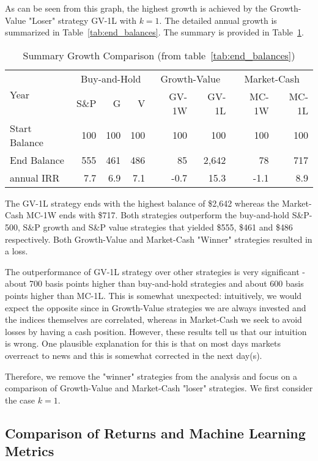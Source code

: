 \documentclass{article}
\begin{document}
As can be seen from this graph, the highest growth is achieved by the 
Growth-Value "Loser" strategy GV-1L with $k=1$.
The detailed annual growth is summarized in Table~\ref{tab:end_balances}. 
The summary is provided in
Table~\ref{tab:end_balances_summary}.
\begin{table}[!ht]
\caption{Summary Growth Comparison (from table~\ref{tab:end_balances})}
    \centering
    \begin{tabular}{l | rrr | rr | rr}
    \hline
\multirow{2}{*}{Year} & \multicolumn{3}{c|}{Buy-and-Hold}   
& \multicolumn{2}{c|}{Growth-Value}  &  \multicolumn{2}{c}{Market-Cash}  \\\cline{2-8}
  & S\&P & G & V & GV-1W & GV-1L & MC-1W & MC-1L \\ \hline
  Start Balance & 100 & 100 & 100 & 100  & 100   & 100 & 100 \\
 End Balance    & 555 & 461 & 486 & 85   & 2,642 & 78 & 717 \\ 
 annual IRR  & 7.7 & 6.9 & 7.1 & -0.7 & 15.3 & -1.1 & 8.9 \\ \hline
    \end{tabular}
    \label{tab:end_balances_summary}
\end{table}

The GV-1L strategy ends with the highest balance of {\$}2,642 whereas 
the Market-Cash MC-1W ends with 
{\$}717. Both strategies outperform
the buy-and-hold S{\&}P-500, S{\&}P growth and S{\&}P value strategies 
that yielded {\$}555, {\$}461 and {\$}486 respectively.
Both Growth-Value and Market-Cash "Winner" strategies resulted in a loss. 

The outperformance of GV-1L strategy over other strategies is very 
significant - about 700 basis points 
higher than buy-and-hold strategies and about 600 basis points higher 
than MC-1L. This is somewhat unexpected: intuitively, we would expect the opposite since in Growth-Value strategies we are always invested and the indices themselves are correlated, 
whereas in Market-Cash we seek to avoid losses by having a cash position. 
However, these results tell us 
that our intuition is wrong. One plausible explanation for this is that on most days markets overreact to news 
and this is somewhat corrected in the next day(s).

Therefore, we remove the "winner" strategies from the analysis and focus on a 
comparison of Growth-Value and Market-Cash 
"loser" strategies. We first consider the case $k=1$.


\subsection{Comparison of Returns and Machine Learning \\ Metrics}
\end{document}
